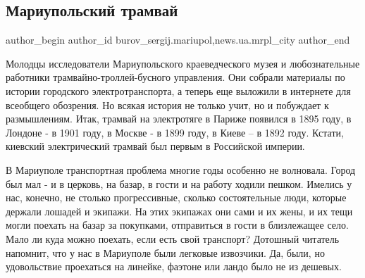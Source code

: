  
 
 
 
 
 
\subsection{Мариупольский трамвай}
\label{sec:05_05_2018.stz.news.ua.mrpl_city.1.mariupolskij_tramvaj}
 
\ifcmt
 author_begin
   author_id burov_sergij.mariupol,news.ua.mrpl_city
 author_end
\fi


Молодцы исследователи Мариупольского краеведческого музея и любознательные
работники трамвайно-троллей\hyp{}бусного управления. Они собрали материалы по истории
городского электротранспорта, а теперь еще выложили в интернете для всеобщего
обозрения. Но всякая история не только учит, но и побуждает к размышлениям.
Итак, трамвай на электротяге в Париже появился в 1895 году, в Лондоне - в 1901
году, в Москве - в 1899 году, в Киеве – в 1892 году. Кстати, киевский
электрический трамвай был первым в Российской империи.

В Мариуполе транспортная проблема многие годы особенно не волновала. Город был
мал - и в церковь, на базар, в гости и на работу ходили пешком. Имелись у нас,
конечно, не столько прогрессивные, сколько состоятельные люди, которые держали
лошадей и экипажи. На этих экипажах они сами и их жены, и их тещи могли поехать
на базар за покупками, отправиться в гости в близлежащее село. Мало ли куда
можно поехать, если есть свой транспорт? Дотошный читатель напомнит, что у нас
в Мариуполе были легковые извозчики. Да, были, но удовольствие проехаться на
линейке, фаэтоне или ландо было не из дешевых.

